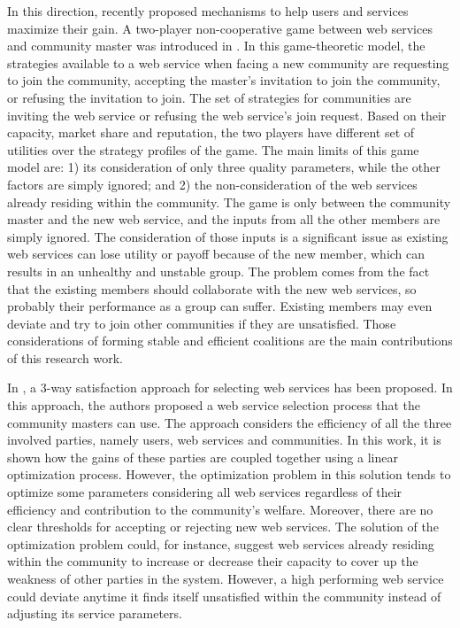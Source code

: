         In this direction, recently \cite{DBLP:conf/IEEEscc/LimTMB12,
        DBLP:conf/IEEEscc/KhosravifarABT11, 10.1109/TSC.2012.12} proposed mechanisms to help
        users and services maximize their gain. A two-player
        non-cooperative game between web services and community master was
        introduced in \cite{DBLP:conf/IEEEscc/KhosravifarABT11}. In this
        game-theoretic model, the strategies available to a web service
        when facing a new community are requesting to join the community,
        accepting the master's invitation to join the community, or
        refusing the invitation to join. The set of strategies for
        communities are inviting the web service or refusing the web
        service's join request. Based on their capacity, market share and
        reputation, the two players have different set of utilities over
        the strategy profiles of the game. The main limits of this game
        model are: 1) its consideration of only three quality parameters,
        while the other factors are simply ignored; and 2) the
        non-consideration of the web services already residing within the
        community. The game is only between the community master and the
        new web service, and the inputs from all the other members are
        simply ignored. The consideration of those inputs is a significant
        issue as existing web services can lose utility or payoff because
        of the new member, which can results in an unhealthy and unstable
        group. The problem comes from the fact that the existing members
        should collaborate with the new web services, so probably their
        performance as a group can suffer. Existing members may even
        deviate and try to join other communities if they are unsatisfied.
        Those considerations of forming stable and efficient coalitions
        are the main contributions of this research work.

        In \cite{DBLP:conf/IEEEscc/LimTMB12}, a 3-way satisfaction approach
        for selecting web services has been proposed. In this approach,
        the authors proposed a web service selection process that the
        community masters can use. The approach considers the efficiency
        of all the three involved parties, namely users, web services and
        communities. In this work, it is shown how the gains of these
        parties are coupled together using a linear optimization process.
        However, the optimization problem in this solution tends to
        optimize some parameters considering all web services regardless
        of their efficiency and contribution to the community's welfare.
        Moreover, there are no clear thresholds for accepting or rejecting
        new web services. The solution of the optimization problem could,
        for instance, suggest web services already residing within the
        community to increase or decrease their capacity to cover up the
        weakness of other parties in the system. However, a high
        performing web service could deviate anytime it finds itself
        unsatisfied within the community instead of adjusting its service
        parameters.

